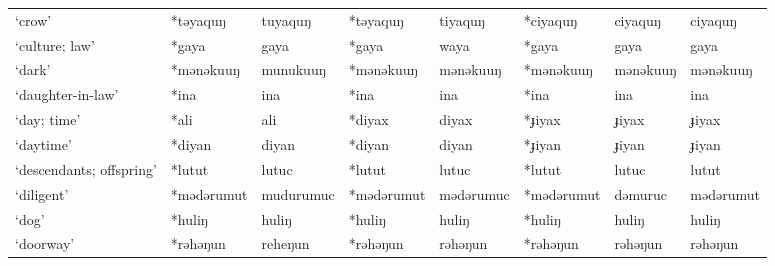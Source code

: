 \begin{landscape}
\begin{longtable}[c]{@{}p{3cm}<{\raggedright}p{2.75cm}<{\raggedright}p{2.75cm}<{\raggedright}p{2.75cm}<{\raggedright}p{2.75cm}<{\raggedright}p{2.75cm}<{\raggedright}p{2.75cm}<{\raggedright}p{2.75cm}<{\raggedright}@{}}
`crow'                                               & *təyaquŋ     & tuyaquŋ                       & *təyaquŋ       & tiyaquŋ                    & *ciyaquŋ         & ciyaquŋ                  & ciyaquŋ                           \\
`culture; law'                                       & *gaya        & gaya                          & *gaya          & waya                       & *gaya            & gaya                     & gaya                              \\
`dark'                                               & *mənəkuuŋ    & munukuuŋ                      & *mənəkuuŋ      & mənəkuuŋ                   & *mənəkuuŋ        & mənəkuuŋ                 & mənəkuuŋ                          \\
`daughter-in-law'                                    & *ina         & ina                           & *ina           & ina                        & *ina             & ina                      & ina                               \\
`day; time'                                          & *ali         & ali                           & *diyax         & diyax                      & *ɟiyax           & ɟiyax                    & ɟiyax                             \\
`daytime'                                            & *diyan       & diyan                         & *diyan         & diyan                      & *ɟiyan           & ɟiyan                    & ɟiyan                             \\
`descendants; offspring'                             & *lutut       & lutuc                         & *lutut         & lutuc                      & *lutut           & lutuc                    & lutut                             \\
`diligent'                                           & *mədərumut   & mudurumuc                     & *mədərumut     & mədərumuc                  & *mədərumut       & dəmuruc                  & mədərumut                         \\
`dog'                                                & *huliŋ       & huliŋ                         & *huliŋ         & huliŋ                      & *huliŋ           & huliŋ                    & huliŋ                             \\
`doorway'                                            & *rəhəŋun     & reheŋun                       & *rəhəŋun       & rəhəŋun                    & *rəhəŋun         & rəhəŋun                  & rəhəŋun                           \\

\end{longtable}
\end{landscape}
